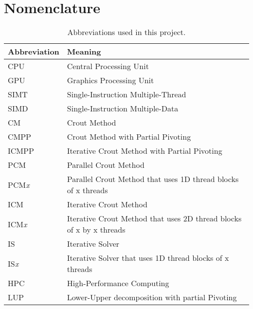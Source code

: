\chapter*{Nomenclature}		 		 		 %

\begin{table}[ht]
	\begin{tabular}{l|l}
		\hline
		Abbreviation  & Meaning                                                             \\ \hline
		CPU			  & Central Processing Unit                                             \\
		GPU			  & Graphics Processing Unit                                            \\
		SIMT		  & Single-Instruction Multiple-Thread                                  \\
		SIMD		  & Single-Instruction Multiple-Data                                    \\
		CM            & Crout Method                                                        \\
		CMPP          & Crout Method with Partial Pivoting                                 	\\
		ICMPP         & Iterative Crout Method with Partial Pivoting                        \\
		PCM           & Parallel Crout Method                                               \\
		PCM\textit{x} & Parallel Crout Method that uses 1D thread blocks of x threads       \\
		ICM           & Iterative Crout Method                                              \\
		ICM\textit{x} & Iterative Crout Method that uses 2D thread blocks of x by x threads \\
		IS            & Iterative Solver                                                    \\
		IS\textit{x}  & Iterative Solver that uses 1D thread blocks of x threads            \\
		HPC           & High-Performance Computing                                          \\
		LUP           & Lower-Upper decomposition with partial Pivoting                     \\ \hline
	\end{tabular}
	\caption{Abbreviations used in this project.}
	\label{Table:nomenclature}
\end{table}